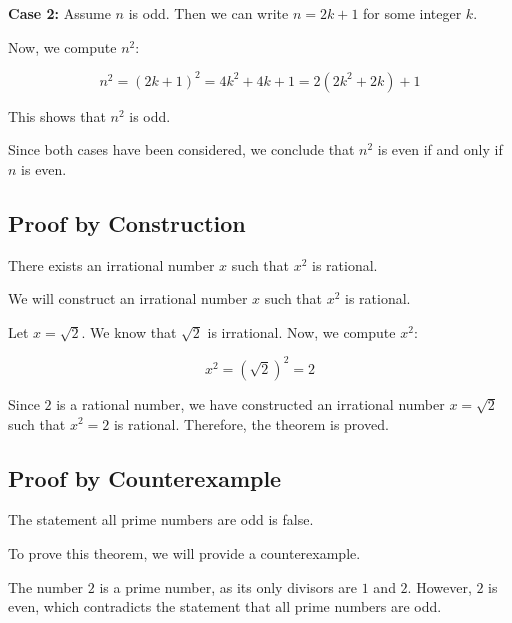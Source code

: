 \textbf{Case 2:} Assume \( n \) is odd. Then we can write \( n = 2k + 1 \) for some integer \( k \).
\vspace{\baselineskip}

Now, we compute \( n^2 \):

\[
	n^2 = {(2k + 1)}^2 = 4k^2 + 4k + 1 = 2(2k^2 + 2k) + 1
\]

This shows that \( n^2 \) is odd.
\vspace{\baselineskip}

Since both cases have been considered, we conclude that \( n^2 \) is even if and only if \( n \) is even.

\QED

\subsection{Proof by Construction}

There exists an irrational number \( x \) such that \( x^2 \) is rational.
\vspace{\baselineskip}

We will construct an irrational number \( x \) such that \( x^2 \) is rational.
\vspace{\baselineskip}

Let \( x = \sqrt{2} \). We know that \( \sqrt{2} \) is irrational. Now, we compute \( x^2 \):
	
\[
	x^2 = (\sqrt{2})^2 = 2
\]
	
Since \( 2 \) is a rational number, we have constructed an irrational number \( x = \sqrt{2} \) such 
that \( x^2 = 2 \) is rational.
Therefore, the theorem is proved.

\QED

\subsection{Proof by Counterexample}

The statement all prime numbers are odd is false.
\vspace{\baselineskip}

To prove this theorem, we will provide a counterexample.
\vspace{\baselineskip}

The number \( 2 \) is a prime number, as its only divisors are \( 1 \) and \( 2 \). However, \( 2 \) is 
even, which contradicts the statement that all prime numbers are odd.
\vspace{\baselineskip}

